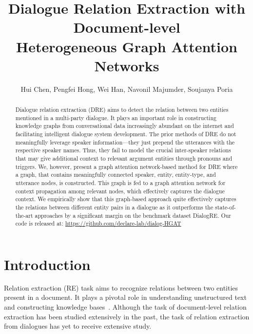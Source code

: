 \documentclass[letterpaper]{article} \usepackage{aaai21}  \usepackage{times}  \usepackage{helvet} \usepackage{courier}  \usepackage[hyphens]{url}  \usepackage{graphicx} \urlstyle{rm} \def\UrlFont{\rm}  \usepackage{natbib}  \usepackage{caption} \frenchspacing  \setlength{\pdfpagewidth}{8.5in}  \setlength{\pdfpageheight}{11in}
\title{Dialogue Relation Extraction with Document-level \\ Heterogeneous Graph Attention Networks
}
\author{
     Hui Chen,
     Pengfei Hong,
     Wei Han,
     Navonil Majumder,
     Soujanya Poria
     \\
 }
\begin{document}
\maketitle

\begin{abstract}

Dialogue relation extraction (DRE) aims to detect the relation between two entities mentioned in a multi-party dialogue. It plays an important role in constructing knowledge graphs from conversational data increasingly abundant on the internet and facilitating intelligent dialogue system development.
The prior methods of DRE do not meaningfully leverage speaker information---they just prepend the utterances with the respective speaker names. Thus, they fail to model the crucial inter-speaker relations that may give additional context to relevant argument entities through pronouns and triggers. We, however, present a graph attention network-based method for DRE where a graph, that contains meaningfully connected speaker, entity, entity-type, and utterance nodes, is constructed. This graph is fed to a graph attention network for context propagation among relevant nodes, which effectively captures the dialogue context.
We empirically show that this graph-based approach quite effectively captures the relations between different entity pairs in a dialogue as it outperforms the state-of-the-art approaches by a significant margin on the benchmark dataset DialogRE. Our code is released at: \url{https://github.com/declare-lab/dialog-HGAT} 





\end{abstract}


\section{Introduction}
Relation extraction (RE) task aims to recognize relations between two entities present in a document. It plays a pivotal role in understanding unstructured text and constructing knowledge bases~\cite{peng2017cross,quirk2017distant}. Although the task of document-level relation extraction has been studied extensively in the past, the task of relation extraction from dialogues has yet to receive extensive study. 
\end{document}
